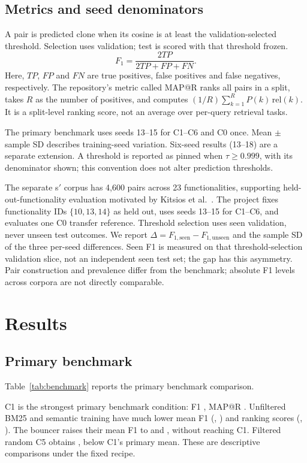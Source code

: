 \documentclass[conference]{IEEEtran}
\begin{document}
\subsection{Metrics and seed denominators}
A pair is predicted clone when its cosine is at least the validation-selected
threshold. Selection uses validation; test is scored with that threshold frozen.
\begin{equation}
F_1=\frac{2TP}{2TP+FP+FN}.
\label{eq:f1}
\end{equation}
Here, $TP$, $FP$ and $FN$ are true positives, false positives and false
negatives, respectively.
The repository's metric called MAP@R ranks all pairs in a split, takes $R$ as
the number of positives, and computes
$(1/R)\sum_{k=1}^{R}P(k)\,\mathrm{rel}(k)$.
It is a split-level ranking score, not an average over per-query retrieval tasks.

The primary benchmark uses seeds 13--15 for C1--C6 and C0 once.
Mean $\pm$ sample SD describes training-seed variation. Six-seed results
(13--18) are a separate extension. A threshold is reported as pinned when
$\tau\geq0.999$, with its denominator shown; this convention does not alter
prediction thresholds.

The separate s$'$ corpus has 4,600 pairs across 23 functionalities, supporting
held-out-functionality evaluation motivated by Kitsios et al.~\cite{unseen}.
The project fixes functionality IDs $\{10,13,14\}$ as held out, uses seeds
13--15 for C1--C6, and evaluates one C0 transfer reference. Threshold selection
uses seen validation, never unseen test outcomes. We report
$\Delta=F_{1,\mathrm{seen}}-F_{1,\mathrm{unseen}}$ and the sample SD of the
three per-seed differences. Seen F1 is measured on that threshold-selection
validation slice, not an independent seen test set; the gap has this asymmetry.
Pair construction and prevalence differ from the
benchmark; absolute F1 levels across corpora are not directly comparable.

\section{Results}
\subsection{Primary benchmark}
Table~\ref{tab:benchmark} reports the primary benchmark comparison.
\begin{table}[t]
\caption{Seeds 13--15; C0 is a single reference without estimated seed variance.
Thresholds are rounded only for display. Predicted + is the fraction of test
pairs predicted clone.}
\label{tab:benchmark}
\centering\small

\end{table}
C1 is the strongest primary benchmark condition: F1 \COneF{}, MAP@R \COneM{}.
Unfiltered BM25 and semantic training have much lower mean F1
(\CTwoF{}, \CThreeF{}) and ranking scores (\CTwoM{}, \CThreeM{}).
The bouncer raises their mean F1 to \CFourF{} and \CSixF{}, without reaching C1.
Filtered random C5 obtains \CFiveF{}, below C1's primary mean.
These are descriptive comparisons under the fixed recipe.
\end{document}
